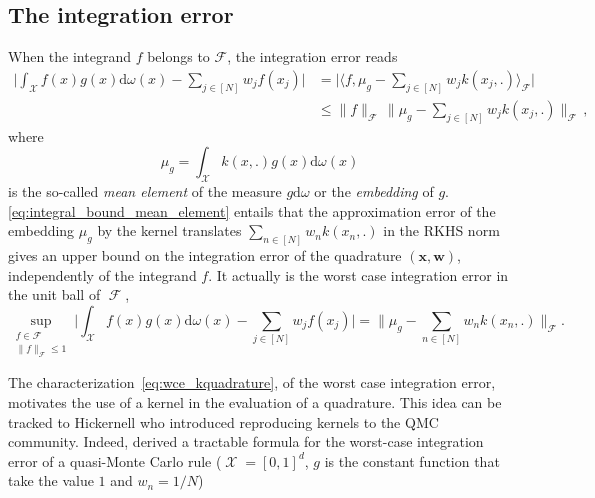 \documentclass[twoside,11pt]{book}
\numberwithin{theorem}{chapter}
\numberwithin{definition}{chapter}
\numberwithin{proposition}{chapter}
\numberwithin{corollary}{chapter}
\numberwithin{example}{chapter}
\numberwithin{lemma}{chapter}
\numberwithin{assumption}{chapter}
\numberwithin{equation}{chapter}
\numberwithin{figure}{chapter}
\DeclareMathOperator{\Tran}{\intercal}
\DeclareMathOperator{\F}{\mathcal{F}}
\DeclareMathOperator{\X}{\mathcal{X}}
\begin{document}


\subsection{The integration error}
\label{subsec:int_error}
When the integrand $f$ belongs to $\mathcal{F}$, the integration error reads \citep{SmGrSoSc07}
\begin{align}
\label{eq:integral_bound_mean_element}
  \bigg|\int_{\mathcal{X}} f(x)g(x)\mathrm{d}\omega(x) - \sum\limits_{j \in [N]} w_{j}f(x_{j}) \bigg|
  & = \bigg|\langle f, \mu_{g} - \sum\limits_{j \in [N]} w_{j} k(x_{j},.) \rangle_{\mathcal{F}} \bigg|\nonumber\\
  & \leq \|f\|_{\mathcal{F}} \, \Big\|\mu_{g} - \sum\limits_{j \in [N]} w_{j} k(x_{j},.)\Big\|_{\mathcal{F}}\,,
\end{align}
where
\begin{equation}
\mu_{g} = \int_{\mathcal{X}} k(x,.) g(x) \mathrm{d}\omega(x)
\end{equation}
 is the so-called \emph{mean element} \citep{DiPi14,MuFuSrSc17} of the measure $g \mathrm{d}\omega$ or the \emph{embedding} of $g$. \eqref{eq:integral_bound_mean_element} entails that the approximation error of the embedding $\mu_{g}$ by the kernel translates $\sum_{n \in [N]} w_{n}k(x_{n},.)$ in the RKHS norm gives an upper bound on the integration error of the quadrature $(\bm{x}, \bm{w})$, independently of the integrand $f$. It actually is the worst case integration error in the unit ball of $\F$,
\begin{equation}\label{eq:wce_kquadrature}
\sup\limits_{\substack{f \in \mathcal{F}\\ \|f\|_{\mathcal{F}} \leq 1}} \bigg|\int_{\mathcal{X}} f(x)g(x)\mathrm{d}\omega(x) - \sum\limits_{j \in [N]} w_{j}f(x_{j}) \bigg| = \|\mu_{g} - \sum\limits_{n \in [N]}w_{n} k(x_{n},.) \|_{\mathcal{F}}.
\end{equation}




The characterization~\eqref{eq:wce_kquadrature}, of the worst case integration error, motivates the use of a kernel in the evaluation of a quadrature. This idea can be tracked to Hickernell \citep{Hic96,Hic98} who introduced reproducing kernels to the QMC community. Indeed, \cite{Hic96} derived a tractable formula for the worst-case integration error of a quasi-Monte Carlo rule ($\X=[0,1]^{d}$, $g$ is the constant function that take the value $1$ and $w_{n}= 1/N$)
\end{document}
